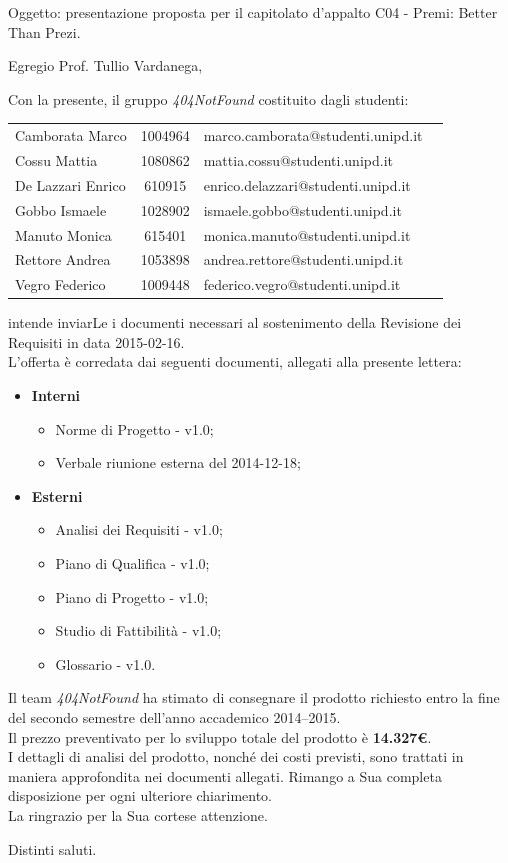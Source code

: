 \documentclass[a4paper,10pt]{letter}
\newcommand{\gruppo}{404NotFound}
\newcommand{\premi}{Premi: Better Than Prezi}
\newcommand{\Vardanega}{Prof. Tullio Vardanega}
\newcommand{\VeFe}{Vegro Federico}
\newcommand{\CaMa}{Camborata Marco}
\newcommand{\GoIs}{Gobbo Ismaele}
\newcommand{\DeEn}{De Lazzari Enrico}
\newcommand{\CoMa}{Cossu Mattia}
\newcommand{\ReAn}{Rettore Andrea}
\newcommand{\MaMo}{Manuto Monica}
\begin{document}
	
	\begin{letter}{Oggetto: presentazione proposta per il capitolato d'appalto  C04 - \premi.}
	\opening {Egregio \Vardanega ,}
	Con la presente, il gruppo \textit{\gruppo} costituito dagli studenti: 
		\begin{center}
		\begin{tabular}{l c l c}					
		\CaMa & 1004964 & marco.camborata@studenti.unipd.it \\
		\CoMa & 1080862 & mattia.cossu@studenti.unipd.it\\
		\DeEn & 610915  & enrico.delazzari@studenti.unipd.it\\ 
		\GoIs & 1028902 & ismaele.gobbo@studenti.unipd.it\\
		\MaMo & 615401  & monica.manuto@studenti.unipd.it\\
		\ReAn & 1053898 & andrea.rettore@studenti.unipd.it\\
		\VeFe & 1009448 & federico.vegro@studenti.unipd.it\\
		\end{tabular}
		\end{center}
	intende inviarLe i documenti necessari al sostenimento della Revisione dei Requisiti in data 2015-02-16.\\
    L'offerta è corredata dai seguenti documenti, allegati alla presente lettera:
			\begin{itemize}
				\item \textbf{Interni}
					\begin{itemize}
						\item Norme di Progetto - v1.0;
						\item Verbale riunione esterna del 2014-12-18;
					\end{itemize}
				\item \textbf{Esterni}
					\begin{itemize}
						\item Analisi dei Requisiti - v1.0;
						\item Piano di Qualifica - v1.0;
						\item Piano di Progetto - v1.0;
						\item Studio di Fattibilità - v1.0;
						\item Glossario - v1.0.
					\end{itemize}
			\end{itemize} 
		Il team \textit{\gruppo} ha stimato di consegnare il prodotto richiesto entro la fine del secondo semestre dell'anno accademico 2014–2015.\\
		Il prezzo preventivato per lo sviluppo totale del prodotto è \textbf{14.327\euro}. \\ 
		I dettagli di analisi del prodotto, nonché dei costi previsti, sono trattati in maniera approfondita nei documenti allegati. Rimango a Sua completa disposizione per ogni ulteriore chiarimento.\\ La ringrazio per la Sua cortese attenzione.
\thispagestyle{fancy}
\closing{Distinti saluti.}
   \end{letter}
\end{document}
